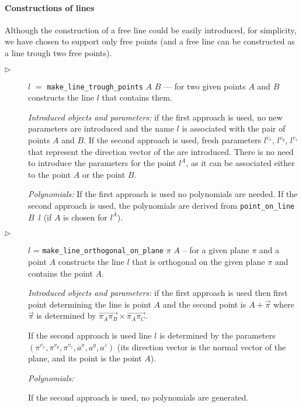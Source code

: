 \documentclass[final,1p,times,authoryear]{elsarticle}
\begin{document}
\paragraph{Constructions of lines}
Although the construction of a free line could be easily introduced,
for simplicity, we have chosen to support only free points (and a free
line can be constructed as a line trough two free points).

\begin{description}
\item[$\triangleright$] $l$ $=$ {\tt make\_line\_trough\_points} $A$
  $B$ --- for two given points $A$ and $B$ constructs the line $l$
  that contains them.

  {\em Introduced objects and parameters:} if the first approach is
  used, no new parameters are introduced and the name $l$ is
  associated with the pair of points $A$ and $B$. If the second
  approach is used, fresh parameters $l^{v_x}$, $l^{v_y}$, $l^{v_z}$
  that represent the direction vector of the are introduced. There is
  no need to introduce the parameters for the point $l^A$, as it can
  be associated either to the point $A$ or the point $B$.

  {\em Polynomials:} If the first approach is used no polynomials are
  needed. If the second approach is used, the polynomials are derived
  from {\tt point\_on\_line $B$ $l$} (if $A$ is chosen for $l^A$).

\item[$\triangleright$] $l$ = {\tt make\_line\_orthogonal\_on\_plane}
  $\pi$ $A$ -- for a given plane $\pi$ and a point $A$ constructs the
  line $l$ that is orthogonal on the given plane $\pi$ and contains
  the point $A$.

  {\em Introduced objects and parameters:} if the first approach is
  used then first point determining the line is point $A$ and the
  second point is $A + \overrightarrow{\pi}$ where
  $\overrightarrow{\pi}$ is determined by
  $\overrightarrow{\pi_A\pi_B} \times \overrightarrow{\pi_A\pi_C}$.

  If the second approach is used line $l$ is determined by the
  parameters $(\pi^{v_x}, \pi^{v_y}, \pi^{v_z}, a^x, a^y, a^z)$ (its
  direction vector is the normal vector of the plane, and its point is
  the point $A$).

  {\em Polynomials:} 

  If the second approach is used, no polynomials are generated.
\end{description}
\end{document}
